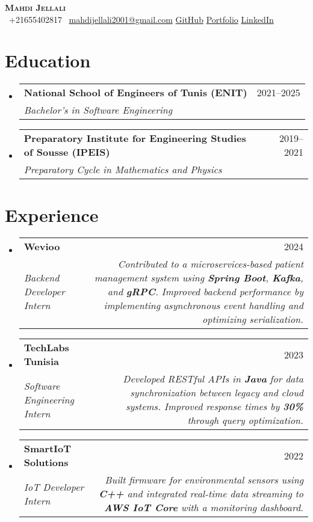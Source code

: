 \documentclass[letterpaper,11pt]{article}
\makeatletter
\newcommand{\resumeSubheading}[4]{
    \vspace{-2pt}\item
    \begin{tabular*}{0.97\textwidth}[t]{l@{\extracolsep{\fill}}r}
    \textbf{#1} & #2 \\
    \textit{\small#3} & \textit{\small #4} \\
    \end{tabular*}\vspace{-7pt}
}
\newcommand{\resumeSubHeadingListStart}{\begin{itemize}[leftmargin=0.15in, label={}]}
\newcommand{\resumeSubHeadingListEnd}{\end{itemize}}
\makeatother
\begin{document}
\begin{center}
\textbf{\Huge \scshape Mahdi Jellali} \\ \vspace{1pt}
\small
\faPhone\ +21655402817 \quad
\faEnvelope\ \href{mailto:mahdijellali2001@gmail.com}{mahdijellali2001@gmail.com} \quad
\href{https://github.com/mahdiJ2001}{GitHub} \quad
\href{https://concise-code-display.vercel.app/}{Portfolio} \quad
\href{https://www.linkedin.com/in/mahdi-jellali/}{LinkedIn}
\end{center}

\vspace{10pt}

\section{Education}
\resumeSubHeadingListStart
\resumeSubheading
{National School of Engineers of Tunis (ENIT)}
{2021–2025}
{Bachelor’s in Software Engineering}
{}
\resumeSubheading
{Preparatory Institute for Engineering Studies of Sousse (IPEIS)}
{2019–2021}
{Preparatory Cycle in Mathematics and Physics}
{}
\resumeSubHeadingListEnd

\section{Experience}
\resumeSubHeadingListStart
\resumeSubheading
{Wevioo}
{2024}
{Backend Developer Intern}
{Contributed to a microservices-based patient management system using \textbf{Spring Boot}, \textbf{Kafka}, and \textbf{gRPC}. Improved backend performance by implementing asynchronous event handling and optimizing serialization.}
\resumeSubheading
{TechLabs Tunisia}
{2023}
{Software Engineering Intern}
{Developed RESTful APIs in \textbf{Java} for data synchronization between legacy and cloud systems. Improved response times by \textbf{30\%} through query optimization.}
\resumeSubheading
{SmartIoT Solutions}
{2022}
{IoT Developer Intern}
{Built firmware for environmental sensors using \textbf{C++} and integrated real-time data streaming to \textbf{AWS IoT Core} with a monitoring dashboard.}
\resumeSubHeadingListEnd

\end{document}

